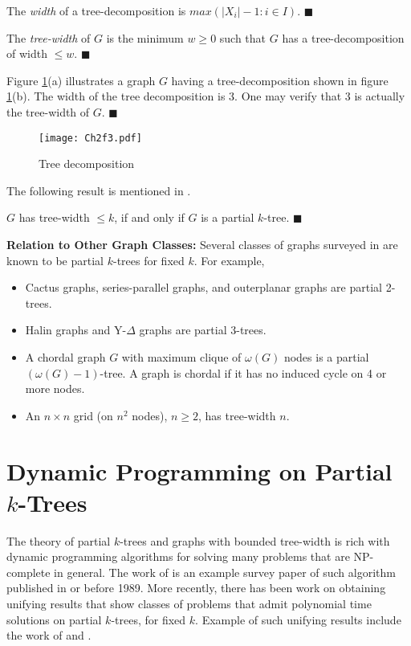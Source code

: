 \begin{definition}
\normalfont
The \textit{width} of a tree-decomposition is $max(|X_i|-1:i\in I)$. $\blacksquare$
\end{definition}
\begin{definition}
\normalfont
The \textit{tree-width} of $G$ is the minimum $w \geq 0$ such that $G$ has a tree-decomposition of width $\leq w$. $\blacksquare$
\end{definition}

\begin{example}
\normalfont
Figure \ref{fig:GandT}(a) illustrates a graph $G$ having a tree-decomposition shown in figure \ref{fig:GandT}(b). The width of the tree decomposition is 3. One may verify that 3 is actually the tree-width of $G$. $\blacksquare$
\end{example}
\begin{figure}[!htb]
\centering
\texttt{[image: Ch2f3.pdf]}
 \caption{ Tree decomposition}
 \label{fig:GandT}

\end{figure}
The following result is mentioned in \cite{brandstadt1999graph}.
\begin{theorem}
\normalfont
$G$ has tree-width $\leq k$, if and only if $G$ is a partial $k$-tree. $\blacksquare$ 
\end{theorem}

{\bf Relation to Other Graph Classes:}  Several classes of graphs surveyed in \cite{brandstadt1999graph} are known to be partial $k$-trees for fixed $k$. For example, 
\begin{itemize}[noitemsep]
\item  Cactus graphs, series-parallel graphs, and outerplanar graphs are partial 2-trees.
\item Halin graphs and Y-$\Delta$ graphs are partial 3-trees.
\item A chordal graph $G$ with maximum clique of $\omega (G)$  nodes is a  partial $(\omega (G)-1)$-tree. A graph is chordal if it has no induced cycle on 4 or more nodes.
\item An $n\times n$ grid (on $n^2$ nodes), $n\geq 2$, has tree-width $n$.
\end{itemize}
\section{Dynamic Programming on Partial $k$-Trees}
\label{ch2:dpk}
The theory of partial $k$-trees and graphs with bounded tree-width is rich with dynamic programming algorithms for solving many problems that are NP-complete in general.
The work of \cite{arnborg1989linear} is an example survey paper of such algorithm published in or before 1989.
%
More recently, there has been work on obtaining unifying results that show classes of problems that admit polynomial time solutions on partial $k$-trees, for fixed $k$.
%
Example of such unifying results include the work of \cite{bodlander1988} and \cite{arnborg1991easy}.

